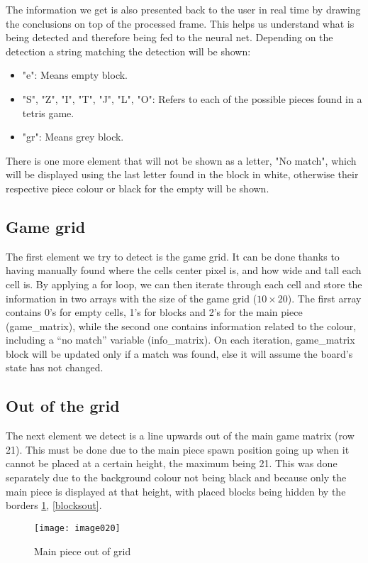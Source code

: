 The information we get is also presented back to the user in real time by drawing the conclusions on top of the processed frame. This helps us understand what is being detected and therefore being fed to the neural net. Depending on the detection a string matching the detection will be shown:

\begin{itemize}
	\item	"e": Means empty block.
	\item	"S", "Z", "I", "T", "J", "L", "O": Refers to each of the possible pieces found in a tetris game.
	\item	"gr": Means grey block.
\end{itemize}

There is one more element that will not be shown as a letter, "No match", which will be displayed using the last letter found in the block in white, otherwise their respective piece colour or black for the empty will be shown.

\subsection{Game grid}
The first element we try to detect is the game grid. It can be done thanks to having manually found where the cells center pixel is, and how wide and tall each cell is. By applying a for loop, we can then iterate through each cell and store the information in two arrays with the size of the game grid ($10\times 20$). The first array contains 0's for empty cells, 1's for blocks and 2's for the main piece (game\_matrix), while the second one contains information related to the  colour, including a “no match” variable (info\_matrix). On each iteration, game\_matrix block will be updated only if a match was found, else it will assume the board’s state has not changed.

\subsection{Out of the grid}
The next element we detect is a line upwards out of the main game matrix (row 21). This must be done due to the main piece spawn position going up when it cannot be placed at a certain height, the maximum being 21. This was done separately due to the background colour not being black and because only the main piece is displayed at that height, with placed blocks being hidden by the borders \ref{mainout}, \ref{blocksout}.

\begin{figure}[h]
\centering
\texttt{[image: image020]}
\caption{\label{mainout}Main piece out of grid}
\end{figure}


